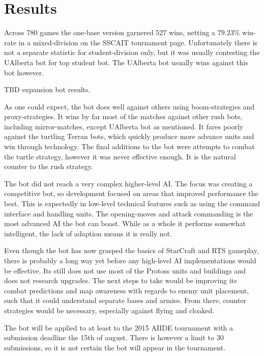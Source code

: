 \chapter{Results}
Across 780 games the one-base version garnered 527 wins, netting a $79.23\%$ win-rate in a mixed-division on the SSCAIT tournament page. Unfortunately there is not a separate statistic for student-division only, but it was usually contesting the UAlberta bot for top student bot. The UAlberta bot usually wins against this bot however.

TBD expansion bot results.

As one could expect, the bot does well against others using boom-strategies and proxy-strategies. It wins by far most of the matches against other rush bots, including mirror-matches, except UAlberta bot as mentioned. It fares poorly against the turtling Terran bots, which quickly produce more advance units and win through technology. The final additions to the bot were attempts to combat the turtle strategy, however it was never effective enough. It is the natural counter to the rush strategy.

The bot did not reach a very complex higher-level AI. The focus was creating a competitive bot, so development focused on areas that improved performance the best. This is expectedly in low-level technical features such as using the command interface and handling units. The opening-moves and attack commanding is the most advanced AI the bot can boast.  While as a whole it performs somewhat intelligent, the lack of adaption means it is really not.

Even though the bot has now grasped the basics of StarCraft and RTS gameplay, there is probably a long way yet before any high-level AI implementations would be effective. Its still does not use most of the Protoss units and buildings and does not research upgrades. The next steps to take would be improving its combat predictions and map awareness with regards to enemy unit placement, such that it could understand separate bases and armies. From there, counter strategies would be necessary, especially against flying and cloaked.

The bot will be applied to at least to the 2015 AIIDE tournament with a submission deadline the 15th of august. There is however a limit to 30 submissions, so it is not certain the bot will appear in the tournament.